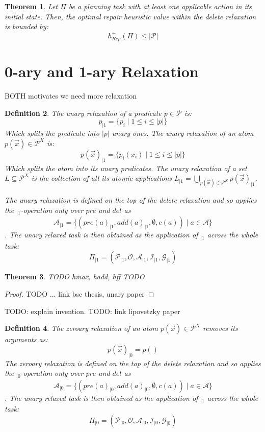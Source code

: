 \documentclass[twocolumn]{article}
\newcommand{\task}{\ensuremath{\Pi}\xspace}
\newcommand{\preds}{\ensuremath{\mathcal{P}}\xspace}
\newcommand{\acts}{\ensuremath{\mathcal{A}}\xspace}
\newcommand{\objects}{\ensuremath{\mathcal{O}}\xspace}
\newcommand{\init}{\ensuremath{\mathcal{I}}\xspace}
\newcommand{\goal}{\ensuremath{\mathcal{G}}\xspace}
\newcommand{\vars}{\ensuremath{X}\xspace}
\newcommand{\someVar}{\ensuremath{x}\xspace}
\newcommand{\atoms}{\ensuremath{\preds^{\vars}}\xspace}
\newcommand{\someAtom}{\ensuremath{p(\vec{\someVar})}\xspace}
\newcommand{\someLiftedSet}{\ensuremath{L}\xspace}
\newcommand{\somePred}{\ensuremath{p}\xspace}
\newcommand{\prename}{\ensuremath{pre}\xspace}
\newcommand{\addname}{\ensuremath{add}\xspace}
\newcommand{\delname}{\ensuremath{del}\xspace}
\newcommand{\pre}[1]{\ensuremath{\prename(#1)}\xspace}
\newcommand{\add}[1]{\ensuremath{\addname(#1)}\xspace}
\newcommand{\arity}[1]{\ensuremath{|#1|}}
\newcommand{\cost}[1]{\ensuremath{c(#1)}\xspace}
\newcommand{\someAct}{\ensuremath{a}\xspace}
\newcommand{\optimalHeuristicRel}{\ensuremath{h^{+}_{Rep}}\xspace}
\newcommand{\unary}[1]{\ensuremath{#1_{|1}}\xspace}
\newcommand{\zeroary}[1]{\ensuremath{#1_{|0}}\xspace}
\newtheorem{theorem}{Theorem}
\newtheorem{definition}[theorem]{Definition}
\begin{document}
	
	\begin{theorem}
		Let \task be a planning task with at least one applicable action in its initial state.
		Then, the optimal repair heuristic value within the delete relaxation is bounded by:
		$$\optimalHeuristicRel(\task) \leq  \arity{\preds}$$
	\end{theorem}
	
	
	
	\section{0-ary and 1-ary Relaxation}
	
	BOTH motivates we need more relaxation
	
	\begin{definition}
		The unary relaxation of a predicate $\somePred \in \preds$ is:
		$$
		\unary{\somePred} = \{\somePred_i \mid 1 \leq i \leq \arity{\somePred}\}
		$$
		Which splits the predicate into \arity{\somePred} unary ones.
		The unary relaxation of an atom $\someAtom \in \atoms$ is:
		$$
		\unary{\someAtom} =  \{\somePred_i(\someVar_i) \mid 1 \leq i \leq \arity{\somePred}\}
		$$
		Which splits the atom into its unary predicates.
		The unary relaxation of a set $\someLiftedSet \subseteq \atoms$ is the collection of all its atomic applications
		$
		\unary{\someLiftedSet} =  \bigcup_{\someAtom \in \atoms} \unary{\someAtom}
		$.
		
		The unary relaxation is defined on the top of the delete relaxation and so applies the {$\unary{}$}-operation only over \prename and \delname as
		$$
		\unary{\acts} = \{(\unary{\pre{\someAct}}, \unary{\add{\someAct}}, \emptyset, \cost{\someAct}) \mid \someAct \in \acts\}
		$$.
		The unary relaxed task is then obtained as the application of $\unary{}$ across the whole task:
		$$
		\unary{\task} = (\unary{\preds}, \objects, \unary{\acts}, \unary{\init}, \unary{\goal})
		$$
	\end{definition}
	
	\begin{theorem}
		TODO hmax, hadd, hff TODO 
	\end{theorem}
	
	\begin{proof}
		TODO ... link bsc thesis, unary paper
	\end{proof}
	
	
	TODO: explain invention.
	TODO: link lipovetzky paper
	
	\begin{definition}
		The zeroary relaxation of an atom $\someAtom \in \atoms$ removes its arguments as:
		$$
		\zeroary{\someAtom} =  \somePred()
		$$
		The zeroary relaxation is defined on the top of the delete relaxation and so applies the {$\zeroary{}$}-operation only over \prename and \delname as
		$$
		\zeroary{\acts} = \{(\zeroary{\pre{\someAct}}, \zeroary{\add{\someAct}}, \emptyset, \cost{\someAct}) \mid \someAct \in \acts\}
		$$.
		The unary relaxed task is then obtained as the application of $\unary{}$ across the whole task:
		$$
		\zeroary{\task} = (\zeroary{\preds}, \objects, \zeroary{\acts}, \zeroary{\init}, \zeroary{\goal})
		$$
	\end{definition}
	
\end{document}
